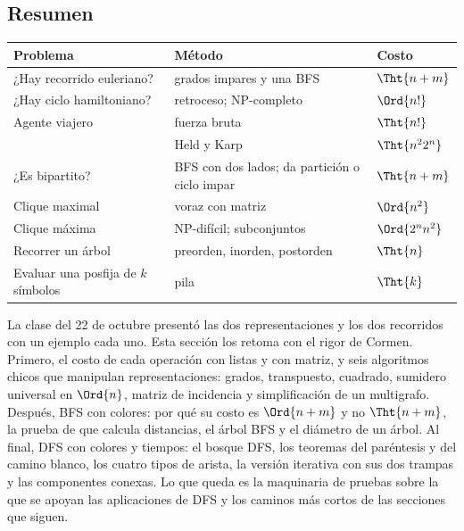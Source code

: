 \documentclass[11pt,letterpaper]{article}
\begin{document}
\subsection*{Resumen}

\begin{center}
\small
\begin{tabular}{>{\raggedright\arraybackslash}p{5.2cm}%
                >{\raggedright\arraybackslash}p{5.4cm}l}
  \toprule
  \textbf{Problema} & \textbf{Método} & \textbf{Costo} \\
  \midrule
  ¿Hay recorrido euleriano? & grados impares y una BFS
    & $\Tht{n + m}$ \\
  \addlinespace
  ¿Hay ciclo hamiltoniano? & retroceso; NP-completo
    & $\Ord{n!}$ \\
  \addlinespace
  Agente viajero & fuerza bruta & $\Tht{n!}$ \\
  & Held y Karp & $\Tht{n^2 2^n}$ \\
  \addlinespace
  ¿Es bipartito? & BFS con dos lados; da partición o ciclo impar
    & $\Tht{n + m}$ \\
  \addlinespace
  Clique maximal & voraz con matriz & $\Ord{n^2}$ \\
  Clique máxima & NP-difícil; subconjuntos & $\Ord{2^n n^2}$ \\
  \addlinespace
  Recorrer un árbol & preorden, inorden, postorden & $\Tht{n}$ \\
  \addlinespace
  Evaluar una posfija de $k$ símbolos & pila & $\Tht{k}$ \\
  \bottomrule
\end{tabular}
\end{center}

\newpage


\label{sec:busquedas}

\begin{quick_sum}
  La clase del 22 de octubre presentó las dos representaciones y los
  dos recorridos con un ejemplo cada uno. Esta sección los retoma con
  el rigor de Cormen. Primero, el costo de cada operación con listas y
  con matriz, y seis algoritmos chicos que manipulan representaciones:
  grados, transpuesto, cuadrado, sumidero universal en $\Ord{n}$,
  matriz de incidencia y simplificación de un multigrafo. Después, BFS
  con colores: por qué su costo es $\Ord{n + m}$ y no $\Tht{n + m}$, la
  prueba de que calcula distancias, el árbol BFS y el diámetro de un
  árbol. Al final, DFS con colores y tiempos: el bosque DFS, los
  teoremas del paréntesis y del camino blanco, los cuatro tipos de
  arista, la versión iterativa con sus dos trampas y las componentes
  conexas. Lo que queda es la maquinaria de pruebas sobre la que se
  apoyan las aplicaciones de DFS y los caminos más cortos de las
  secciones que siguen.
\end{quick_sum}
\end{document}

